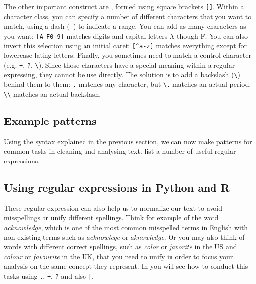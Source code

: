 The other important construct are , formed using square brackets \verb|[]|.
Within a character class, you can specify a number of different characters that you want to match, using a dash (\verb|-|) to indicate a range.
You can add as many characters as you want: \verb|[A-F0-9]| matches digits and capital letters A though F.
You can also invert this selection using an initial caret: \verb|[^a-z]| matches everything except for lowercase lating letters.
Finally, you sometimes need to match a control character  (e.g. \verb!+!, \verb|?|, \verb|\|). Since those characters have a special meaning within a regular expressing, they cannot be use directly. The solution is to add a backslash (\verb|\|) behind them to  them:
\verb|.| matches any character, but \verb|\.| matches an actual period. \verb|\\| matches an actual backslash.

\subsection{Example patterns}

Using the syntax explained in the previous section, we can now make patterns for common tasks in cleaning and analysing text.
 list a number of useful regular expressions. 

\subsection{Using regular expressions in Python and R}


These regular expression can also help us to normalize our text to avoid misspellings or unify different spellings. Think for example of the word \emph{acknowledge}, which is one of the most common misspelled terms in English with non-existing terms such as \emph{acknowlege} or \emph{aknowledge}. Or you may also think of words with different correct spellings, such as \emph{color} or \emph{favorite} in the US and \emph{colour} or \emph{favourite} in the UK, that you need to unify in order to focus your analysis on the same concept they represent. In  you will see how to conduct this tasks using \verb+.+, \verb|+|, \verb+?+ and also \verb+|+.


